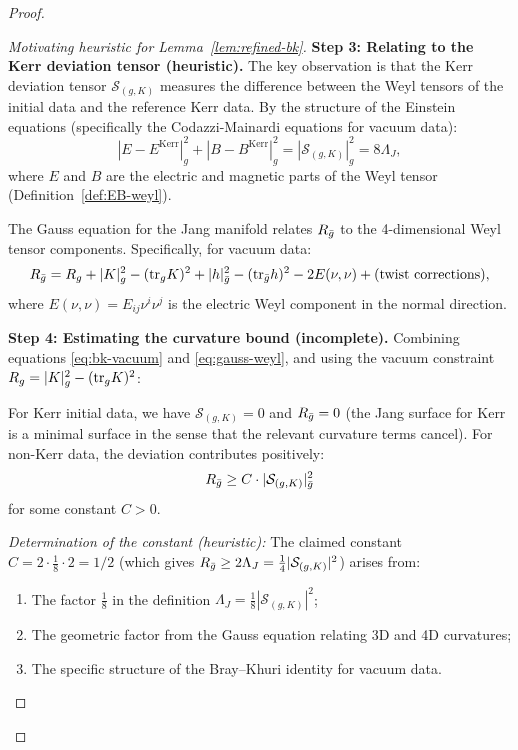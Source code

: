 \begin{proof}
\begin{proof}[Motivating heuristic for Lemma~\ref{lem:refined-bk}]
\textbf{Step 3: Relating to the Kerr deviation tensor (heuristic).}
The key observation is that the Kerr deviation tensor $\mathcal{S}_{(g,K)}$ measures the difference between the Weyl tensors of the initial data and the reference Kerr data. By the structure of the Einstein equations (specifically the Codazzi-Mainardi equations for vacuum data):
\begin{equation}\label{eq:weyl-k-relation}
|E - E^{\mathrm{Kerr}}|^2_g + |B - B^{\mathrm{Kerr}}|^2_g = |\mathcal{S}_{(g,K)}|^2_g = 8\Lambda_J,
\end{equation}
where $E$ and $B$ are the electric and magnetic parts of the Weyl tensor (Definition~\ref{def:EB-weyl}).

The Gauss equation for the Jang manifold relates $R_{\bar{g}}$ to the 4-dimensional Weyl tensor components. Specifically, for vacuum data:
\begin{equation}\label{eq:gauss-weyl}
R_{\bar{g}} = R_g + |K|^2_g - (\mathrm{tr}_g K)^2 + |h|^2_{\bar{g}} - (\mathrm{tr}_{\bar{g}} h)^2 - 2E(\nu, \nu) + \text{(twist corrections)},
\end{equation}
where $E(\nu, \nu) = E_{ij}\nu^i\nu^j$ is the electric Weyl component in the normal direction.

\textbf{Step 4: Estimating the curvature bound (incomplete).}
Combining equations \eqref{eq:bk-vacuum} and \eqref{eq:gauss-weyl}, and using the vacuum constraint $R_g = |K|^2_g - (\mathrm{tr}_g K)^2$:

For Kerr initial data, we have $\mathcal{S}_{(g,K)} = 0$ and $R_{\bar{g}} = 0$ (the Jang surface for Kerr is a minimal surface in the sense that the relevant curvature terms cancel). For non-Kerr data, the deviation contributes positively:
\[
R_{\bar{g}} \geq C \cdot |\mathcal{S}_{(g,K)}|^2_{\bar{g}}
\]
for some constant $C > 0$.

\textit{Determination of the constant (heuristic):} The claimed constant $C = 2 \cdot \frac{1}{8} \cdot 2 = 1/2$ (which gives $R_{\bar{g}} \geq 2\Lambda_J = \frac{1}{4}|\mathcal{S}_{(g,K)}|^2$) arises from:
\begin{enumerate}
    \item The factor $\frac{1}{8}$ in the definition $\Lambda_J = \frac{1}{8}|\mathcal{S}_{(g,K)}|^2$;
    \item The geometric factor from the Gauss equation relating 3D and 4D curvatures;
    \item The specific structure of the Bray--Khuri identity for vacuum data.
\end{enumerate}


\end{proof}
\end{proof}
